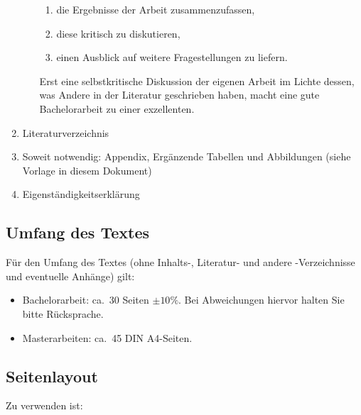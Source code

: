 \documentclass[a4paper,12pt]{scrartcl} %
\begin{document}
\begin{enumerate}
\begin{itemize}
\begin{enumerate}[label=\roman*.]
        \item die Ergebnisse der Arbeit zusammenzufassen,
        \item diese kritisch zu diskutieren,
        \item einen Ausblick auf weitere Fragestellungen zu liefern.
    \end{enumerate}
    Erst eine selbstkritische Diskussion der eigenen Arbeit im Lichte dessen, was Andere in der Literatur geschrieben haben, macht eine gute Bachelorarbeit zu einer exzellenten.
	\end{itemize}
\item Literaturverzeichnis	
\item Soweit notwendig: Appendix, Ergänzende Tabellen und Abbildungen (siehe Vorlage in diesem Dokument)
\item Eigenständigkeitserklärung
\end{enumerate}

\subsection{Umfang des Textes}
Für den Umfang des Textes (ohne Inhalts-, Literatur- und andere
-Verzeichnisse und eventuelle Anhänge) gilt:

\begin{itemize}
\item Bachelorarbeit: ca.\ 30 Seiten $\pm 10\%$. Bei Abweichungen hiervor halten Sie bitte Rücksprache.

\item Masterarbeiten: ca.\ 45 DIN A4-Seiten.
\end{itemize}

\subsection{Seitenlayout}
Zu verwenden ist:
\end{document}
